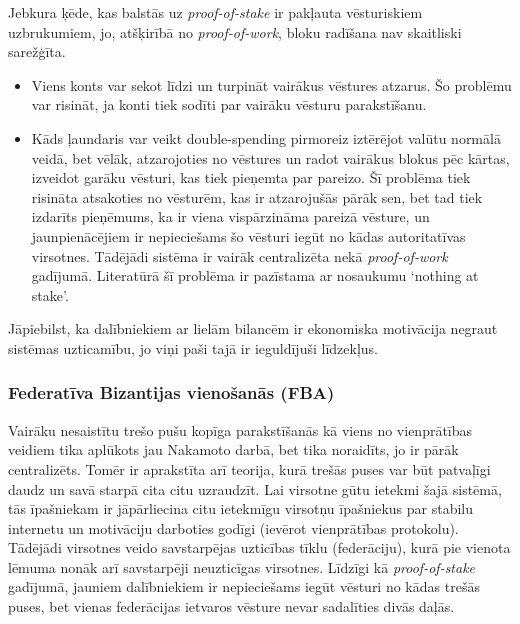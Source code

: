 Jebkura ķēde, kas balstās uz \textit{proof-of-stake} ir pakļauta vēsturiskiem uzbrukumiem, jo, atšķirībā no \textit{proof-of-work}, bloku radīšana nav skaitliski sarežģīta.
\begin{itemize}
    \item Viens konts var sekot līdzi un turpināt vairākus vēstures atzarus. Šo problēmu var risināt, ja konti tiek sodīti par vairāku vēsturu parakstīšanu.
    \item Kāds ļaundaris var veikt double-spending pirmoreiz iztērējot valūtu normālā veidā, bet vēlāk, atzarojoties no vēstures un radot vairākus blokus pēc kārtas, izveidot garāku vēsturi, kas tiek pieņemta par pareizo. Šī problēma tiek risināta atsakoties no vēsturēm, kas ir atzarojušās pārāk sen, bet tad tiek izdarīts pieņēmums, ka ir viena vispārzināma pareizā vēsture, un jaunpienācējiem ir nepieciešams šo vēsturi iegūt no kādas autoritatīvas virsotnes. Tādējādi sistēma ir vairāk centralizēta nekā \textit{proof-of-work} gadījumā.\cite{poelstra15} Literatūrā šī problēma ir pazīstama ar nosaukumu `nothing at stake'.
\end{itemize}
Jāpiebilst, ka dalībniekiem ar lielām bilancēm ir ekonomiska motivācija negraut sistēmas uzticamību, jo viņi paši tajā ir ieguldījuši līdzekļus.

\subsubsection{Federatīva Bizantijas vienošanās (FBA)}
Vairāku nesaistītu trešo pušu kopīga parakstīšanās kā viens no vienprātības veidiem tika aplūkots jau Nakamoto darbā\cite{nakamoto08}, bet tika noraidīts, jo ir pārāk centralizēts. Tomēr ir aprakstīta arī teorija, kurā trešās puses var būt patvaļīgi daudz un savā starpā cita citu uzraudzīt.\cite{mazieres15}
Lai virsotne gūtu ietekmi šajā sistēmā, tās īpašniekam ir jāpārliecina citu ietekmīgu virsotņu īpašniekus par stabilu internetu un motivāciju darboties godīgi (ievērot vienprātības protokolu). Tādējādi virsotnes veido savstarpējas uzticības tīklu (federāciju), kurā pie vienota lēmuma nonāk arī savstarpēji neuzticīgas virsotnes. Līdzīgi kā \textit{proof-of-stake} gadījumā, jauniem dalībniekiem ir nepieciešams iegūt vēsturi no kādas trešās puses, bet vienas federācijas ietvaros vēsture nevar sadalīties divās daļās.


